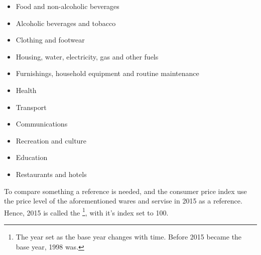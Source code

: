 \parbox[t]{0.49\linewidth}{\begin{itemize}
		\item Food and non-alcoholic beverages
		\item Alcoholic beverages and tobacco
		\item Clothing and footwear
		\item Housing, water, electricity, gas and other fuels
		\item Furnishings, household equipment and routine maintenance

\end{itemize}}
\parbox[t]{0.49\linewidth}{\begin{itemize}
		\item Health	
		\item Transport
		\item Communications
		\item Recreation and culture
		\item Education
		\item Restaurants and hotels

\end{itemize}}
To compare something a reference is needed, and the consumer price index use the price level of the aforementioned wares and servise in 2015 as a reference. Hence, 2015 is called the \footnote{The year set as the base year changes with time. Before 2015 became the base year, 1998 was.}, with it's index set to 100.\regv
{}\vsk

